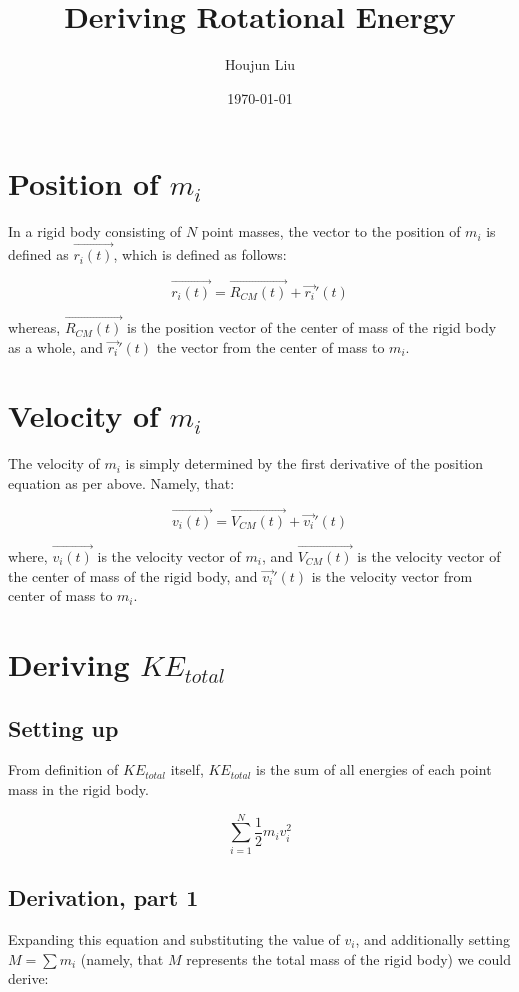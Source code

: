 \documentclass[letterpaper]{article}
\author{Houjun Liu}
\date{\today}
\title{Deriving Rotational Energy}
\renewcommand{\tableofcontents}{}
\begin{document}
\tableofcontents



\section{Position of \(m_i\)}
\label{sec:org320a4ae}
In a rigid body consisting of \(N\) point masses, the vector to the position of \(m_i\) is defined as \(\vec{r_i(t)}\), which is defined as follows:

\begin{equation}
    \vec{r_i(t)} = \vec{R_{CM}(t)} + \vec{r_i}'(t)
\end{equation}

whereas, \(\vec{R_{CM}(t)}\) is the position vector of the center of mass of the rigid body as a whole, and \(\vec{r_i}'(t)\) the vector from the center of mass to \(m_i\).

\section{Velocity of \(m_i\)}
\label{sec:org67ae378}
The velocity of \(m_i\) is simply determined by the first derivative of the position equation as per above. Namely, that:

\begin{equation}
    \vec{v_i(t)} = \vec{V_{CM}(t)} + \vec{v_i}'(t)
\end{equation}

where, \(\vec{v_i(t)}\) is the velocity vector of \(m_i\), and \(\vec{V_{CM}(t)}\) is the velocity vector of the center of mass of the rigid body, and \(\vec{v_i}'(t)\) is the velocity vector from center of mass to \(m_i\).

\section{Deriving \(KE_{total}\)}
\label{sec:orgc4b6b47}

\subsection{Setting up}
\label{sec:org408cfed}
From definition of \(KE_{total}\) itself, \(KE_{total}\) is the sum of all energies of each point mass in the rigid body.

\begin{equation}
    \sum^N_{i=1} \frac{1}{2}m_iv_i^2
\end{equation}


\subsection{Derivation, part 1}
\label{sec:org9379337}
Expanding this equation and substituting the value of \(v_i\), and additionally setting \(M = \sum m_i\) (namely, that \(M\) represents the total mass of the rigid body) we could derive:
\end{document}

